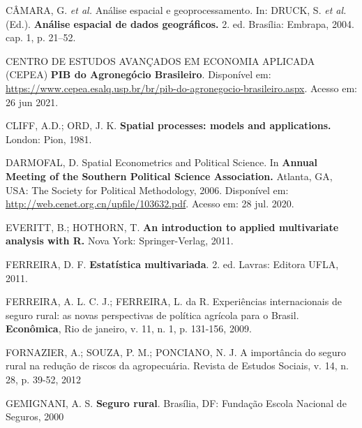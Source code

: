 \documentclass[
	12pt,				%
	openright,			%
	oneside,			%
	a4paper,			%
	chapter=TITLE,		%
	section=TITLE,		%
	english,			%
	french,				%
	spanish,			%
	brazil				%
	]{abntex2}
\begin{document}
\begin{thebibliography}{}
    {CÂMARA, G. \textit{et al.} Análise espacial e geoprocessamento. In: DRUCK, S. \textit{et al.} (Ed.). \textbf{Análise espacial de dados geográficos.} 2. ed. Brasília: Embrapa, 2004. cap. 1, p. 21–52.}
    
    {CENTRO DE ESTUDOS AVANÇADOS EM ECONOMIA APLICADA (CEPEA) \textbf{PIB do Agronegócio Brasileiro}. Disponível em: \url{https://www.cepea.esalq.usp.br/br/pib-do-agronegocio-brasileiro.aspx}. Acesso em: 26 jun 2021.}
    
    {CLIFF, A.D.; ORD, J. K. \textbf{Spatial processes: models and applications.} London: Pion, 1981.}
    
    {DARMOFAL, D. Spatial Econometrics and Political Science. In \textbf{Annual Meeting of the Southern Political Science Association.}  Atlanta, GA, USA: The Society for Political Methodology, 2006. Disponível em: \url{http://web.cenet.org.cn/upfile/103632.pdf}. Acesso em: 28 jul. 2020.}
    
    {EVERITT, B.; HOTHORN, T. \textbf{An introduction to applied multivariate analysis with R.} Nova York: Springer-Verlag, 2011.}
    
    {FERREIRA, D. F. \textbf{Estatística multivariada}. 2. ed. Lavras: Editora UFLA, 2011.}
    
    {FERREIRA, A. L. C. J.; FERREIRA, L. da R. Experiências internacionais de seguro rural: as novas perspectivas de política agrícola para o Brasil. \textbf{Econômica}, Rio de janeiro, v. 11, n. 1, p. 131-156, 2009.}
    
    {FORNAZIER,  A.;  SOUZA,  P.  M.;  PONCIANO,  N.  J.  A  importância  do  seguro  rural  na  redução  de riscos da agropecuária. Revista de Estudos Sociais, v. 14, n. 28, p. 39-52, 2012}
    
    {GEMIGNANI, A. S. \textbf{Seguro rural}. Brasília, DF: Fundação  Escola Nacional de Seguros, 2000}
    

\end{thebibliography}
\end{document}
